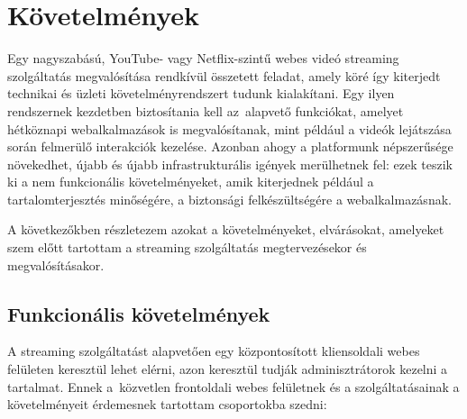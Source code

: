 \chapter{Követelmények}

Egy nagyszabású, YouTube- vagy Netflix-szintű webes videó streaming szolgáltatás megvalósítása rendkívül összetett feladat, amely köré így kiterjedt technikai és üzleti követelményrendszert tudunk kialakítani. Egy ilyen rendszernek kezdetben biztosítania kell az~alapvető funkciókat, amelyet hétköznapi webalkalmazások is megvalósítanak, mint például a videók lejátszása során felmerülő interakciók kezelése. Azonban ahogy a platformunk népszerűsége növekedhet, újabb és újabb infrastrukturális igények merülhetnek fel: ezek teszik ki a nem funkcionális követelményeket, amik kiterjednek például a tartalomterjesztés minőségére, a biztonsági felkészültségére a webalkalmazásnak.

A következőkben részletezem azokat a követelményeket, elvárásokat, amelyeket szem előtt tartottam a streaming szolgáltatás megtervezésekor és megvalósításakor.

\section{Funkcionális követelmények}

A streaming szolgáltatást alapvetően egy központosított kliensoldali webes felületen keresztül lehet elérni, azon keresztül tudják adminisztrátorok kezelni a tartalmat. Ennek a~közvetlen frontoldali webes felületnek és a szolgáltatásainak a követelményeit érdemesnek tartottam csoportokba szedni:

